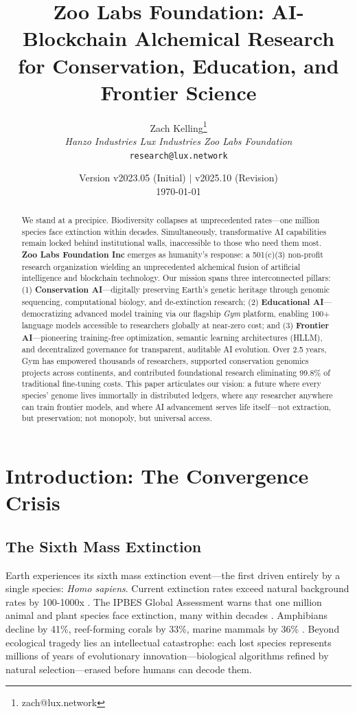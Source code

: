 \documentclass[twocolumn,11pt]{article}
\title{\textbf{Zoo Labs Foundation: AI-Blockchain Alchemical Research for Conservation, Education, and Frontier Science}}
\author{
Zach Kelling\thanks{zach@lux.network}\\
\textit{Hanzo Industries \quad Lux Industries \quad Zoo Labs Foundation}\\
\texttt{research@lux.network}
}
\date{Version v2023.05 (Initial) $\mid$ v2025.10 (Revision) \\
\today}
\begin{document}
\zoocoverpage

\begin{abstract}
\noindent We stand at a precipice. Biodiversity collapses at unprecedented rates—one million species face extinction within decades. Simultaneously, transformative AI capabilities remain locked behind institutional walls, inaccessible to those who need them most. \textbf{Zoo Labs Foundation Inc} emerges as humanity's response: a 501(c)(3) non-profit research organization wielding an unprecedented alchemical fusion of artificial intelligence and blockchain technology. Our mission spans three interconnected pillars: (1) \textbf{Conservation AI}—digitally preserving Earth's genetic heritage through genomic sequencing, computational biology, and de-extinction research; (2) \textbf{Educational AI}—democratizing advanced model training via our flagship \textit{Gym} platform, enabling 100+ language models accessible to researchers globally at near-zero cost; and (3) \textbf{Frontier AI}—pioneering training-free optimization, semantic learning architectures (HLLM), and decentralized governance for transparent, auditable AI evolution. Over 2.5 years, Gym has empowered thousands of researchers, supported conservation genomics projects across continents, and contributed foundational research eliminating 99.8\% of traditional fine-tuning costs. This paper articulates our vision: a future where every species' genome lives immortally in distributed ledgers, where any researcher anywhere can train frontier models, and where AI advancement serves life itself—not extraction, but preservation; not monopoly, but universal access.
\end{abstract}

\section{Introduction: The Convergence Crisis}

\subsection{The Sixth Mass Extinction}

Earth experiences its sixth mass extinction event—the first driven entirely by a single species: \textit{Homo sapiens}. Current extinction rates exceed natural background rates by 100-1000x \citep{ceballos2015accelerated}. The IPBES Global Assessment warns that one million animal and plant species face extinction, many within decades \citep{ipbes2019global}. Amphibians decline by 41\%, reef-forming corals by 33\%, marine mammals by 36\% \citep{wwf2020living}. Beyond ecological tragedy lies an intellectual catastrophe: each lost species represents millions of years of evolutionary innovation—biological algorithms refined by natural selection—erased before humans can decode them.
\end{document}
